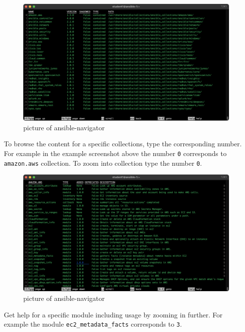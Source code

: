 \begin{figure}[H]
\centering
\includegraphics{images/01_interactive-collections.png}
\caption{picture of ansible-navigator}
\end{figure}

To browse the content for a specific collections, type the corresponding
number. For example in the example screenshot above the number
\texttt{0} corresponds to \texttt{amazon.aws} collection. To zoom into
collection type the number \texttt{0}.

\begin{Shaded}
\begin{Highlighting}[]
\end{Highlighting}
\end{Shaded}

\begin{figure}[H]
\centering
\includegraphics{images/01_interactive-aws.png}
\caption{picture of ansible-navigator}
\end{figure}

Get help for a specific module including usage by zooming in further.
For example the module \texttt{ec2\_metadata\_facts} corresponds to \texttt{3}.

